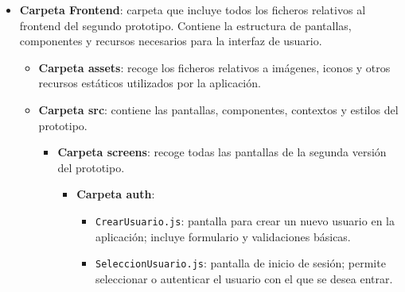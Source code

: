 \begin{itemize}
\begin{itemize}
\begin{itemize}
\begin{itemize}
\begin{itemize}
                    \item \texttt{users.js}: rutas para la gestión de usuarios, autenticación básica y permisos.
                \end{itemize}
                \item \texttt{db.js}: fichero de configuración de la conexión a la base de datos; contiene la lógica de inicialización, pooling y exporta utilidades para realizar consultas parametrizadas.
                \item \texttt{server.js}: punto de entrada del servidor; configura Express, middleware, autenticación básica, registro de rutas y arranque del servicio.
            \end{itemize}
            \item \texttt{package.json}: fichero que declara dependencias, scripts y metadatos del backend V2.
            \item \texttt{.env}: fichero de variables de entorno que contiene parámetros sensibles y de configuración como la URL de la base de datos, credenciales y el puerto de ejecución. No debe subirse a repositorios públicos.
        \end{itemize}
        \item \textbf{Carpeta Frontend}: carpeta que incluye todos los ficheros relativos al frontend del segundo prototipo. Contiene la estructura de pantallas, componentes y recursos necesarios para la interfaz de usuario.
        \begin{itemize}
            \item \textbf{Carpeta assets}: recoge los ficheros relativos a imágenes, iconos y otros recursos estáticos utilizados por la aplicación.
            \item \textbf{Carpeta src}: contiene las pantallas, componentes, contextos y estilos del prototipo.
            \begin{itemize}
                \item \textbf{Carpeta screens}: recoge todas las pantallas de la segunda versión del prototipo.
                \begin{itemize}
                    \item \textbf{Carpeta auth}:
                    \begin{itemize}
                        \item \texttt{CrearUsuario.js}: pantalla para crear un nuevo usuario en la aplicación; incluye formulario y validaciones básicas.
                        \item \texttt{SeleccionUsuario.js}: pantalla de inicio de sesión; permite seleccionar o autenticar el usuario con el que se desea entrar.

\end{itemize}
\end{itemize}
\end{itemize}
\end{itemize}
\end{itemize}
\end{itemize}
